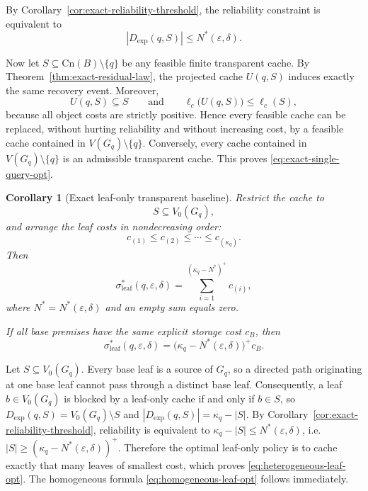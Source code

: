\documentclass[journal]{IEEEtran}
\makeatletter
\newcommand{\Cn}{\text{Cn}}
\newtheorem{corollary}{Corollary}[section]
\numberwithin{equation}{section}
\renewenvironment{proof}[1][\proofname]{\par
  \pushQED{\qed}%
  \normalfont \topsep6\p@\@plus6\p@\relax
  \trivlist
  \item[\hskip\labelsep
        \itshape
    #1\@addpunct{.}]\ignorespaces
}{%
  \popQED\endtrivlist\@endpefalse
}
\makeatother
\begin{document}
\begin{proof}
By Corollary~\ref{cor:exact-reliability-threshold}, the reliability constraint
is equivalent to
\[
  |D_{\mathrm{exp}}(q,S)|\le N^*(\varepsilon,\delta).
\]

Now let \(S\subseteq\Cn(B)\setminus\{q\}\) be any feasible finite transparent
cache.  By Theorem~\ref{thm:exact-residual-law}, the projected cache \(U(q,S)\)
induces exactly the same recovery event.  Moreover,
\[
  U(q,S)\subseteq S
  \qquad\text{and}\qquad
  \ell_c\bigl(U(q,S)\bigr)\le \ell_c(S),
\]
because all object costs are strictly positive.  Hence every feasible cache can
be replaced, without hurting reliability and without increasing cost, by a
feasible cache contained in \(V(G_q)\setminus\{q\}\).  Conversely, every cache
contained in \(V(G_q)\setminus\{q\}\) is an admissible transparent cache.
This proves \eqref{eq:exact-single-query-opt}.
\end{proof}

\begin{corollary}[Exact leaf-only transparent baseline]
\label{cor:leaf-only-opt}
Restrict the cache to
\[
  S\subseteq V_0(G_q),
\]
and arrange the leaf costs in nondecreasing order:
\[
  c_{(1)}\le c_{(2)}\le\cdots\le c_{(\kappa_q)}.
\]
Then
\begin{equation}
  \sigma_{\mathrm{leaf}}^*
  (q,\varepsilon,\delta)
  =
  \sum_{i=1}^{(\kappa_q-N^*)^+}c_{(i)},
\label{eq:heterogeneous-leaf-opt}
\end{equation}
where
\(N^*=N^*(\varepsilon,\delta)\) and an empty sum equals zero.

If all base premises have the same explicit storage cost \(c_B\), then
\begin{equation}
  \sigma_{\mathrm{leaf}}^*
  (q,\varepsilon,\delta)
  =
  \bigl(\kappa_q-N^*(\varepsilon,\delta)\bigr)^+c_B.
\label{eq:homogeneous-leaf-opt}
\end{equation}
\end{corollary}

\begin{proof}
Let \(S\subseteq V_0(G_q)\).  Every base leaf is a source of \(G_q\), so a
directed path originating at one base leaf cannot pass through a distinct base
leaf.  Consequently, a leaf \(b\in V_0(G_q)\) is blocked by a leaf-only cache
if and only if \(b\in S\), so
\(D_{\mathrm{exp}}(q,S)=V_0(G_q)\setminus S\) and
\(|D_{\mathrm{exp}}(q,S)|=\kappa_q-|S|\).
By Corollary~\ref{cor:exact-reliability-threshold}, reliability is equivalent
to \(\kappa_q-|S|\le N^*(\varepsilon,\delta)\), i.e.\
\(|S|\ge(\kappa_q-N^*(\varepsilon,\delta))^+\).
Therefore the optimal leaf-only policy is to cache exactly that many leaves of
smallest cost, which proves \eqref{eq:heterogeneous-leaf-opt}.  The homogeneous
formula \eqref{eq:homogeneous-leaf-opt} follows immediately.
\end{proof}
\end{document}
